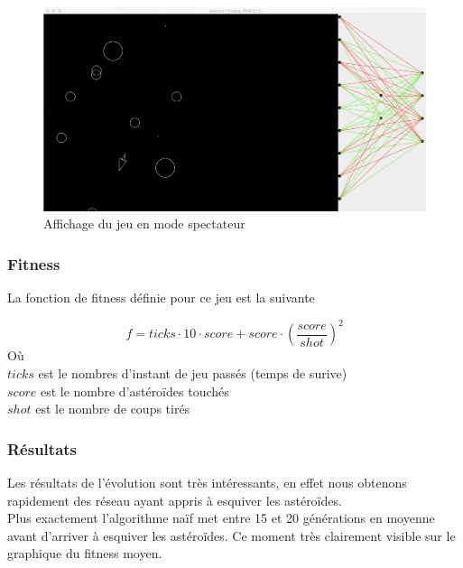 \documentclass{article}
\begin{document}
\begin{figure}[H]
\begin{center}
	\includegraphics[scale=0.35]{spectatormode.png}
	\caption{Affichage du jeu en mode spectateur}
\end{center}
\end{figure}

\subsubsection{Fitness}

La fonction de fitness définie pour ce jeu est la suivante

\begin{equation}
	f = ticks \cdot 10 \cdot score + score \cdot (\frac{score}{shot})^2	
\end{equation}
Où\\
$ticks$ est le nombres d'instant de jeu passés (temps de surive)\\
$score$ est le nombre d'astéroïdes touchés\\
$shot$ est le nombre de coups tirés\\

\subsubsection{Résultats}

Les résultats de l'évolution sont très intéressants, en effet nous obtenons rapidement des réseau ayant appris à esquiver les astéroïdes.\\

Plus exactement l'algorithme naïf met entre 15 et 20 générations en moyenne avant d'arriver à esquiver les astéroïdes. Ce moment très clairement visible sur le graphique du fitness moyen.\\
\end{document}

